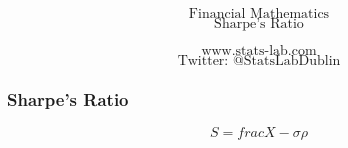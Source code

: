 \documentclass{beamer}
\begin{document}
\begin{frame}
\Huge
\[\mbox{Financial Mathematics}\]
\LARGE
\[\mbox{Sharpe's Ratio}\]

\Large
\[\mbox{www.stats-lab.com}\]
\[\mbox{Twitter: @StatsLabDublin}\]

\end{frame}
\begin{frame}
\frametitle{Sharpe's Ratio}
\Large
\[ S = frac{X-\sigma}{\rho}\]
\end{frame}
\end{document}
